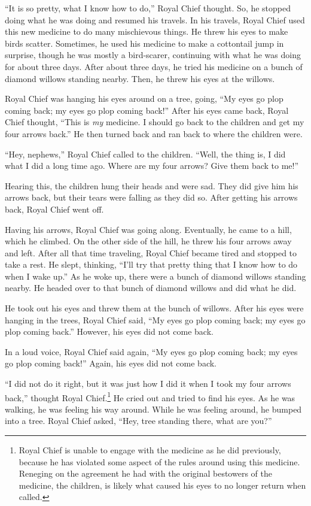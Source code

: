 ``It is so pretty, what I know how to do,'' Royal Chief thought. So, he stopped doing what he was doing and resumed his travels. In his travels, Royal Chief used this new medicine to do many mischievous things. He threw his eyes to make birds scatter. Sometimes, he used his medicine to make a cottontail jump in surprise, though he was mostly a bird-scarer, continuing with what he was doing for about three days. After about three days, he tried his medicine on a bunch of diamond willows standing nearby. Then, he threw his eyes at the willows.

Royal Chief was hanging his eyes around on a tree, going, ``My eyes go plop coming back; my eyes go plop coming back!'' After his eyes came back, Royal Chief thought, ``This is \textit{my} medicine. I should go back to the children and get my four arrows back.'' He then turned back and ran back to where the children were.

``Hey, nephews,'' Royal Chief called to the children. ``Well, the thing is, I did what I did a long time ago. Where are my four arrows? Give them back to me!''

Hearing this, the children hung their heads and were sad. They did give him his arrows back, but their tears were falling as they did so. After getting his arrows back, Royal Chief went off. 

Having his arrows, Royal Chief was going along. Eventually, he came to a hill, which he climbed. On the other side of the hill, he threw his four arrows away and left. After all that time traveling, Royal Chief became tired and stopped to take a rest. He slept, thinking, ``I'll try that pretty thing that I know how to do when I wake up.'' As he woke up, there were a bunch of diamond willows standing nearby. He headed over to that bunch of diamond willows and did what he did. 

He took out his eyes and threw them at the bunch of willows. After his eyes were hanging in the trees, Royal Chief said, ``My eyes go plop coming back; my eyes go plop coming back.'' However, his eyes did not come back.

In a loud voice, Royal Chief said again, ``My eyes go plop coming back; my eyes go plop coming back!'' Again, his eyes did not come back.

``I did not do it right, but it was just how I did it when I took my four arrows back,'' thought Royal Chief.\footnote{Royal Chief is unable to engage with the medicine as he did previously, because he has violated some aspect of the rules around using this medicine. Reneging on the agreement he had with the original bestowers of the medicine, the children, is likely what caused his eyes to no longer return when called.} He cried out and tried to find his eyes. As he was walking, he was feeling his way around. While he was feeling around, he bumped into a tree. Royal Chief asked, ``Hey, tree standing there, what are you?''

